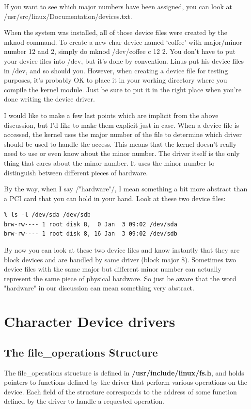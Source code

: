 \documentclass[11pt]{article}
\begin{document}
\begin{itemize}
If you want to see which major numbers have been assigned, you can look at /usr/src/linux/Documentation/devices.txt.

When the system was installed, all of those device files were created by the mknod command. To create a new char device named `coffee' with major/minor number 12 and 2, simply do mknod /dev/coffee c 12 2. You don't have to put your device files into /dev, but it's done by convention. Linus put his device files in /dev, and so should you. However, when creating a device file for testing purposes, it's probably OK to place it in your working directory where you compile the kernel module. Just be sure to put it in the right place when you're done writing the device driver.

I would like to make a few last points which are implicit from the above discussion, but I'd like to make them explicit just in case. When a device file is accessed, the kernel uses the major number of the file to determine which driver should be used to handle the access. This means that the kernel doesn't really need to use or even know about the minor number. The driver itself is the only thing that cares about the minor number. It uses the minor number to distinguish between different pieces of hardware.

By the way, when I say /"hardware"/, I mean something a bit more abstract than a PCI card that you can hold in your hand. Look at these two device files:

\begin{verbatim}
% ls -l /dev/sda /dev/sdb
brw-rw---- 1 root disk 8,  0 Jan  3 09:02 /dev/sda
brw-rw---- 1 root disk 8, 16 Jan  3 09:02 /dev/sdb
\end{verbatim}

By now you can look at these two device files and know instantly that they are block devices and are handled by same driver (block major 8). Sometimes two device files with the same major but different minor number can actually represent the same piece of physical hardware. So just be aware that the word "hardware" in our discussion can mean something very abstract.
\end{itemize}

\section*{Character Device drivers}
\label{sec-6}
\subsection*{The file\_operations Structure}
\label{sec-6-1}
The file\_operations structure is defined in \textbf{/usr/include/linux/fs.h}, and holds pointers to functions defined by the driver that perform various operations on the device. Each field of the structure corresponds to the address of some function defined by the driver to handle a requested operation.
\end{document}
